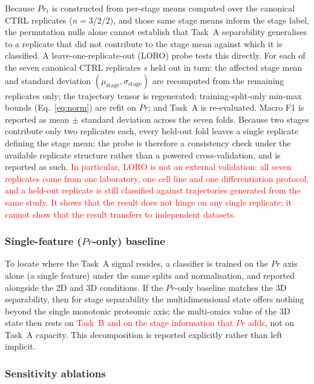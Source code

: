 \documentclass[5p,times,twocolumn]{elsarticle}
\newcommand{\rtag}[1]{}
\newcommand{\rev}[2]{\rtag{#1}\textcolor{red}{#2}}
\begin{document}
Because $Pr_{t}$ is constructed from per-stage means computed
over the canonical CTRL replicates ($n = 3/2/2$), and those
same stage means inform the stage label, the permutation
nulls alone cannot establish that Task~A separability
generalises to a replicate that did not contribute to the
stage mean against which it is classified. A
leave-one-replicate-out (LORO) probe tests this directly.
For each of the seven canonical CTRL replicates $s$ held out
in turn: the affected stage mean and standard deviation
$(\mu_{\text{stage}}, \sigma_{\text{stage}})$ are recomputed
from the remaining replicates only; the trajectory tensor is
regenerated; training-split-only min-max bounds
(Eq.~\eqref{eq:norm}) are refit on $Pr$; and Task~A is
re-evaluated. Macro F1 is reported as mean $\pm$ standard
deviation across the seven folds.
Because two stages contribute only two replicates each, every
held-out fold leaves a single replicate defining the stage
mean; the probe is therefore a consistency check under the
available replicate structure rather than a powered
cross-validation, and is reported as such.
\rev{R1.3}{In particular, LORO is not an external validation:
  all seven replicates come from one laboratory, one cell line
  and one differentiation protocol, and a held-out replicate is
  still classified against trajectories generated from the same
  study. It shows that the result does not hinge on any single
  replicate; it cannot show that the result transfers to
  independent datasets.}

\subsubsection{Single-feature ($Pr$-only) baseline}
\label{sec:pronly}

To locate where the Task~A signal resides, a classifier is
trained on the $Pr$ axis alone (a single feature) under the
same splits and normalisation, and reported alongside the 2D
and 3D conditions. If the $Pr$-only baseline matches the 3D
separability, then for stage separability the
multidimensional state offers nothing beyond the single
monotonic proteomic axis; the multi-omics value of the 3D
state then rests on \rev{AC}{Task~B and on the stage information
  that $Pr$ adds}, not on Task~A capacity. This decomposition is
reported explicitly rather than left implicit.

\subsubsection{Sensitivity ablations}
\label{sec:ablations}
\end{document}
